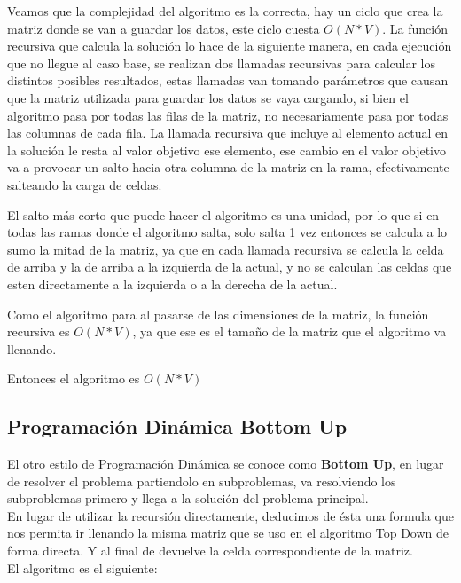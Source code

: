 \documentclass[a4paper]{article}
\begin{document}
Veamos que la complejidad del algoritmo es la correcta, hay un ciclo que crea la matriz donde se van a guardar los datos, este ciclo cuesta $O(N*V)$. La función recursiva que calcula la solución lo hace de la siguiente manera, en cada ejecución que no llegue al caso base, se realizan dos llamadas recursivas para calcular los distintos posibles resultados, estas llamadas van tomando parámetros que causan que la matriz utilizada para guardar los datos se vaya cargando, si bien el algoritmo pasa por todas las filas de la matriz, no necesariamente pasa por todas las columnas de cada fila. La llamada recursiva que incluye al elemento actual en la solución le resta al valor objetivo ese elemento, ese cambio en el valor objetivo va a provocar un salto hacia otra columna de la matriz en la rama, efectivamente salteando la carga de celdas.


El salto más corto que puede hacer el algoritmo es una unidad, por lo que si en todas las ramas donde el algoritmo salta, solo salta 1 vez entonces se calcula a lo sumo la mitad de la matriz, ya que en cada llamada recursiva se calcula la celda de arriba y la de arriba a la izquierda de la actual, y no se calculan las celdas que esten directamente a la izquierda o a la derecha de la actual.


Como el algoritmo para al pasarse de las dimensiones de la matriz, la función recursiva es $O(N*V)$, ya que ese es el tamaño de la matriz que el algoritmo va llenando.

Entonces el algoritmo es $O(N*V)$

\subsection{Programaci\'on Din\'amica Bottom Up}

El otro estilo de Programación Dinámica se conoce como \textbf{Bottom Up}, en lugar de resolver el problema partiendolo en subproblemas, va resolviendo los subproblemas primero y llega a la solución del problema principal.
\\
En lugar de utilizar la recursión directamente, deducimos de ésta una formula que nos permita ir llenando la misma matriz que se uso en el algoritmo Top Down de forma directa. Y al final de devuelve la celda correspondiente de la matriz.
\\
El algoritmo es el siguiente:
\end{document}
